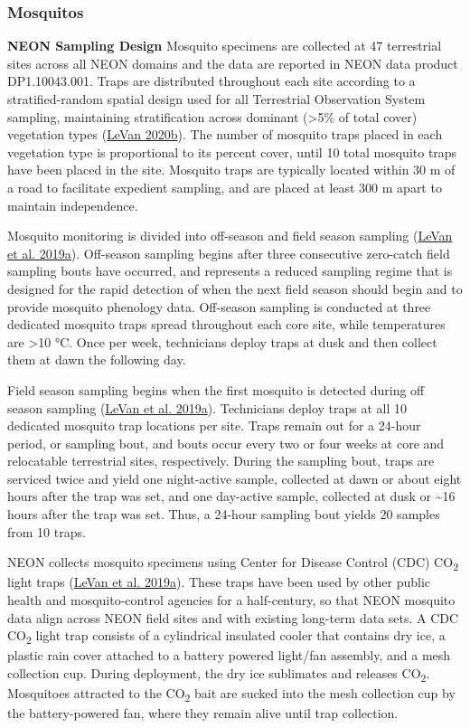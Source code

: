 \documentclass[
  12pt,
]{article}
\begin{document}
\hypertarget{mosquitos}{%
\subsubsection{Mosquitos}\label{mosquitos}}

\textbf{NEON Sampling Design} Mosquito specimens are collected at 47 terrestrial sites across all NEON domains and the data are reported in NEON data product DP1.10043.001. Traps are distributed throughout each site according to a stratified-random spatial design used for all Terrestrial Observation System sampling, maintaining stratification across dominant (\textgreater5\% of total cover) vegetation types (\protect\hyperlink{ref-LeVan2020b}{LeVan 2020b}). The number of mosquito traps placed in each vegetation type is proportional to its percent cover, until 10 total mosquito traps have been placed in the site. Mosquito traps are typically located within 30 m of a road to facilitate expedient sampling, and are placed at least 300 m apart to maintain independence.

Mosquito monitoring is divided into off-season and field season sampling (\protect\hyperlink{ref-LeVan2019b}{LeVan et al. 2019a}). Off-season sampling begins after three consecutive zero-catch field sampling bouts have occurred, and represents a reduced sampling regime that is designed for the rapid detection of when the next field season should begin and to provide mosquito phenology data. Off-season sampling is conducted at three dedicated mosquito traps spread throughout each core site, while temperatures are \textgreater10 °C. Once per week, technicians deploy traps at dusk and then collect them at dawn the following day.

Field season sampling begins when the first mosquito is detected during off season sampling (\protect\hyperlink{ref-LeVan2019b}{LeVan et al. 2019a}). Technicians deploy traps at all 10 dedicated mosquito trap locations per site. Traps remain out for a 24-hour period, or sampling bout, and bouts occur every two or four weeks at core and relocatable terrestrial sites, respectively. During the sampling bout, traps are serviced twice and yield one night-active sample, collected at dawn or about eight hours after the trap was set, and one day-active sample, collected at dusk or \textasciitilde16 hours after the trap was set. Thus, a 24-hour sampling bout yields 20 samples from 10 traps.

NEON collects mosquito specimens using Center for Disease Control (CDC) CO\textsubscript{2} light traps (\protect\hyperlink{ref-LeVan2019b}{LeVan et al. 2019a}). These traps have been used by other public health and mosquito-control agencies for a half-century, so that NEON mosquito data align across NEON field sites and with existing long-term data sets. A CDC CO\textsubscript{2} light trap consists of a cylindrical insulated cooler that contains dry ice, a plastic rain cover attached to a battery powered light/fan assembly, and a mesh collection cup. During deployment, the dry ice sublimates and releases CO\textsubscript{2}. Mosquitoes attracted to the CO\textsubscript{2} bait are sucked into the mesh collection cup by the battery-powered fan, where they remain alive until trap collection.
\end{document}
